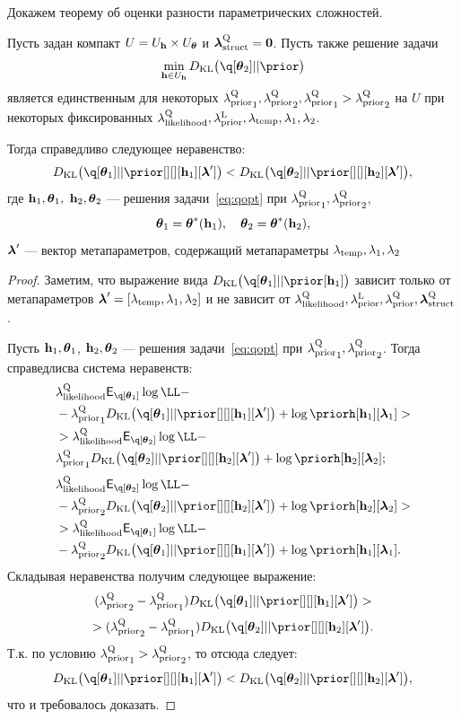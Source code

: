 Докажем теорему об оценки разности параметрических сложностей.
\begin{lemma}
\label{lem:cp}
Пусть задан компакт $U = U_{\mathbf{h}} \times U_{\boldsymbol{\theta}}$ и  $\boldsymbol{\lambda}_\text{struct}^\text{Q}=\mathbf{0}$. Пусть также решение задачи
\begin{equation}
\label{eq:cp_theorem_kl}
\min_{\h \in \Uh} \KL{\q[\teta_2]}{\prior}
\end{equation}
 является единственным для некоторых ${\lambda_\text{prior}^\text{Q}}_1, {\lambda_\text{prior}^\text{Q}}_2, {\lambda_\text{prior}^\text{Q}}_1 > {\lambda_\text{prior}^\text{Q}}_2$ на $U$ при некоторых фиксированных $\lambda_\text{likelihood}^\text{Q}, \lambda_\text{prior}^\text{L}, \lambda_{\text{temp}}, \lambda_1, \lambda_2$.

Тогда справедливо следующее неравенство:
\[
    \KL{\q[\teta_1]}{\prior[][][\h_1][\lam']}  <   \KL{\q[\teta_2]}{\prior[][][\h_2][\lam']},
\]
где $\mathbf{h}_1, \boldsymbol{\theta}_1,$ $\mathbf{h}_2, \boldsymbol{\theta}_2$  --- решения задачи~\eqref{eq:qopt} при ${\lambda_\text{prior}^\text{Q}}_1, {\lambda_\text{prior}^\text{Q}}_2$,
$$
\boldsymbol{\theta}_1 = \boldsymbol{\theta}^{*}(\mathbf{h}_1), \quad  \boldsymbol{\theta}_2 = \boldsymbol{\theta}^{*}(\mathbf{h}_2),
$$
$\boldsymbol{\lambda}'$ --- вектор метапараметров, содержащий метапараметры $\lambda_{\text{temp}}, \lambda_1, \lambda_2$

\end{lemma}
\begin{proof}
Заметим, что выражение вида $\KL{\q[\teta_1]}{\prior[\h_1]}$ зависит только от метапараметров  $\boldsymbol{\lambda}' = [\lambda_{\text{temp}}, \lambda_1, \lambda_2]$ и не зависит от $\lambda_\text{likelihood}^\text{Q}, \lambda_\text{prior}^\text{L}, \lambda_\text{prior}^\text{Q}, \boldsymbol{\lambda}_\text{struct}^\text{Q}$.  

Пусть $\mathbf{h}_1, \boldsymbol{\theta}_1$, $\mathbf{h}_2, \boldsymbol{\theta}_2$  --- решения задачи~\eqref{eq:qopt} при ${\lambda_\text{prior}^\text{Q}}_1, {\lambda_\text{prior}^\text{Q}}_2$.
Тогда справедлисва система неравенств:
\begin{align*}
&\lamLL \E_{\q[\teta_1]}\log \LL - \\
&-{\lamCQ}_1\KL{\q[\teta_1]}{\prior[][][\h_1][\lam']} + \log\priorh[\h_1][\lam_1]> \\
&> \lamLL \E_{\q[\teta_2]}\log \LL - \\
&{\lamCQ}_1\KL{\q[\teta_2]}{\prior[][][\h_2][\lam']} + \log\priorh[\h_2][\lam_2];
\end{align*}
\begin{align*}
&\lamLL \E_{\q[\teta_2]}\log \LL - \\
&-{\lamCQ}_2\KL{\q[\teta_2]}{\prior[][][\h_2][\lam']} + \log\priorh[\h_2][\lam_2] >\\
&> \lamLL \E_{\q[\teta_1]}\log \LL -\\
&- {\lamCQ}_2\KL{\q[\teta_1]}{\prior[][][\h_1][\lam']} + \log\priorh[\h_1][\lam_1].
\end{align*}
Складывая неравенства получим следующее выражение:
\[
   ({\lamCQ}_2 - {\lamCQ}_1 )\KL{\q[\teta_1]}{\prior[][][\h_1][\lam']}  >
\]
\[
>    ({\lamCQ}_2 - {\lamCQ}_1 )\KL{\q[\teta_2]}{\prior[][][\h_2][\lam']}. 
\]
Т.к. по условию ${\lambda_\text{prior}^\text{Q}}_1 > {\lambda_\text{prior}^\text{Q}}_2$, то отсюда следует:
\[
    \KL{\q[\teta_1]}{\prior[][][\h_1][\lam']}  <   \KL{\q[\teta_2]}{\prior[][][\h_2][\lam']},
\]
что и требовалось доказать.
\end{proof}

